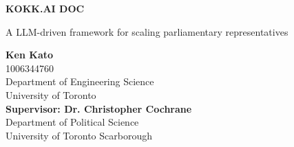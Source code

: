 \begin{titlepage}
    \begin{center}
        \vspace*{1cm}
            
        \Huge
        \textbf{KOKK.AI DOC}
            
        \vspace{0.5cm}
        \LARGE
        A LLM-driven framework for scaling parliamentary representatives
            
        \vspace{1.5cm}
            
        \textbf{Ken Kato}\\
        \Large
        1006344760\\
        Department of Engineering Science\\
        University of Toronto\\
        \vspace{1.5cm}
        \LARGE
        \textbf{Supervisor: Dr. Christopher Cochrane}\\
        \Large
        Department of Political Science\\
        University of Toronto Scarborough\\        
            
    \end{center}
\end{titlepage}
